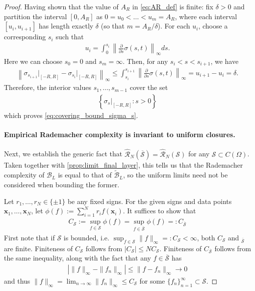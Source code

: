 \documentclass{article}
\def\vx{{\bm{x}}}
\def\cB{{\mathcal{B}}}
\def\cR{{\mathcal{R}}}
\def\cS{{\mathcal{S}}}
\begin{document}
\begin{appendices}
\begin{proof}
    Having shown that the value of $A_R$ in \eqref{eq:AR_def} is finite: fix $\delta > 0$ and partition the interval $[0, A_R]$ as $0 = u_0 < \dots < u_m = A_R$, where each interval $[u_i, u_{i+1}]$ has length exactly $\delta$ (so that $m = A_R/\delta$). For each $u_i$, choose a corresponding $s_i$ such that
    \begin{align}
        u_i = \int_0^{s_i} \left\| \frac{\partial}{\partial s} \sigma(s,t) \right\|_\infty ds.
    \end{align}
    Here we can choose $s_0 = 0$ and $s_m = \infty$. Then, for any $s_i < s < s_{i+1}$, we have
    \begin{align}
        \left\| \sigma_{s_{i+1}} \big\rvert_{[-R,R]} - \sigma_{s_i}\big\rvert_{[-R,R]} \right\|_\infty \leq \int_{s_i}^{s_{i+1}} \left\| \frac{\partial}{\partial s} \sigma(s,t) \right\|_\infty = u_{i+1} - u_i = \delta.
    \end{align}
    Therefore, the interior values $s_1, \dots, s_{m-1}$ cover the set
    \begin{align}
        \left\{ \sigma_s \big \rvert_{[-R, R]} : s > 0 \right\}
    \end{align}
    which proves \eqref{eq:covering_bound_sigma_s}.
    
    \paragraph{Empirical Rademacher complexity is invariant to uniform closures.} Next, we establish the generic fact that $\widehat{\cR}_N(\overline{\cS}) = \widehat{\cR}_N(\cS)$ for any $\cS \subset C(\Omega)$. Taken together with \cref{prop:limit_final_layer}, this tells us that the Rademacher complexity of $\cB_L$ is equal to that of $\widetilde{\cB}_L$, so the uniform limits need not be considered when bounding the former. 
    
    Let $r_1, \dots, r_N \in \{ \pm 1 \}$ be any fixed signs. For the given signs and data points $\vx_1, \dots, \vx_N$, let $\phi(f) := \sum_{i=1}^N r_i f(\vx_i)$. It suffices to show that 
    \begin{align} \label{eq:A_S_equality}
        C_{\cS} := \sup_{f \in \cS} \phi(f) =  \sup_{f \in \overline{\cS}} \phi(f) =: C_{\overline{\cS}}
    \end{align}
    First note that if $\cS$ is bounded, i.e. $\sup_{f \in \cS} \| f \|_\infty =: C_{\cS} < \infty$, both $C_\cS$ and $_{\overline{\cS}}$ are finite. Finiteness of $C_{\cS}$ follows from $|C_{\cS}| \leq N C_{\cS}$. Finiteness of $C_{\overline{\cS}}$ follows from the same inequality, along with the fact that any $f \in \overline{\cS}$ has
    \begin{align}
        | \| f \|_\infty - \| f_n \|_\infty| \leq \| f - f_n \|_\infty \to 0
    \end{align}
    and thus $\| f \|_\infty = \lim_{n \to \infty} \| f_n \|_\infty \leq C_{\cS}$ for some $\{ f_n \}_{n=1}^\infty \subset \cS$.


\end{proof}
\end{appendices}
\end{document}
